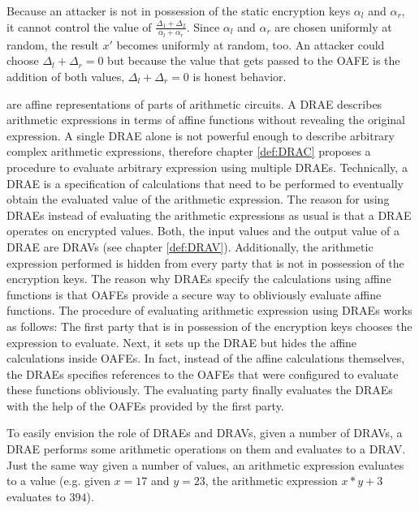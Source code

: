 Because an attacker is not in possession of the static encryption keys
$\alpha_l$ and $\alpha_r$, it cannot control the value of $\frac{\Delta_1 +
\Delta_2}{\alpha_l + \alpha_r}$. Since $\alpha_l$ and $\alpha_r$ are chosen
uniformly at random, the result $x'$ becomes uniformly at random, too. An
attacker could choose $\Delta_l + \Delta_r = 0$ but because the value that gets
passed to the OAFE is the addition of both values, $\Delta_l + \Delta_r = 0$ is
honest behavior.


%
%
\label{sec:drae}

 are affine representations of
parts of arithmetic circuits. A DRAE describes arithmetic expressions in terms
of affine functions without revealing the original expression. A single DRAE
alone is not powerful enough to describe arbitrary complex arithmetic
expressions, therefore chapter \ref{def:DRAC} proposes a procedure to evaluate
arbitrary expression using multiple DRAEs. Technically, a DRAE is a
specification of calculations that need to be performed to eventually obtain the
evaluated value of the arithmetic expression. The reason for using DRAEs instead
of evaluating the arithmetic expressions as usual is that a DRAE operates on
encrypted values. Both, the input values and the output value of a DRAE are
DRAVs (see chapter \ref{def:DRAV}). Additionally, the arithmetic expression
performed is hidden from every party that is not in possession of the encryption
keys.  The reason why DRAEs specify the calculations using affine functions is
that OAFEs provide a secure way to obliviously evaluate affine functions. The
procedure of evaluating arithmetic expression using DRAEs works as follows: The
first party that is in possession of the encryption keys chooses the expression
to evaluate.  Next, it sets up the DRAE but hides the affine calculations inside
OAFEs. In fact, instead of the affine calculations themselves, the DRAEs
specifies references to the OAFEs that were configured to evaluate these
functions obliviously. The evaluating party finally evaluates the DRAEs with the
help of the OAFEs provided by the first party.

To easily envision the role of DRAEs and DRAVs, given a number of DRAVs, a DRAE
performs some arithmetic operations on them and evaluates to a DRAV. Just the
same way given a number of values, an arithmetic expression evaluates to a value
(e.g. given $x=17$ and $y=23$, the arithmetic expression $x*y + 3$ evaluates to
$394$).

